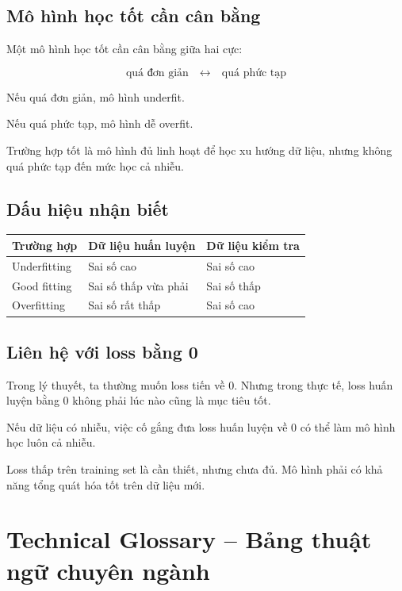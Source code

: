 \subsection{Mô hình học tốt cần cân bằng}

Một mô hình học tốt cần cân bằng giữa hai cực:

\[
    \text{quá đơn giản}
    \quad \longleftrightarrow \quad
    \text{quá phức tạp}
\]

Nếu quá đơn giản, mô hình underfit.

Nếu quá phức tạp, mô hình dễ overfit.

Trường hợp tốt là mô hình đủ linh hoạt để học xu hướng dữ liệu, nhưng không quá phức tạp đến mức học cả nhiễu.

\subsection{Dấu hiệu nhận biết}

\begin{center}
\begin{tabular}{p{}p{}p{}}
\toprule
Trường hợp & Dữ liệu huấn luyện & Dữ liệu kiểm tra \\
\midrule
Underfitting & Sai số cao & Sai số cao \\
Good fitting & Sai số thấp vừa phải & Sai số thấp \\
Overfitting & Sai số rất thấp & Sai số cao \\
\bottomrule
\end{tabular}
\end{center}

\subsection{Liên hệ với loss bằng 0}

Trong lý thuyết, ta thường muốn loss tiến về 0. Nhưng trong thực tế, loss huấn luyện bằng 0 không phải lúc nào cũng là mục tiêu tốt.

Nếu dữ liệu có nhiễu, việc cố gắng đưa loss huấn luyện về 0 có thể làm mô hình học luôn cả nhiễu.

\begin{ghinho}
Loss thấp trên training set là cần thiết, nhưng chưa đủ. Mô hình phải có khả năng tổng quát hóa tốt trên dữ liệu mới.
\end{ghinho}

\section{Technical Glossary -- Bảng thuật ngữ chuyên ngành}

